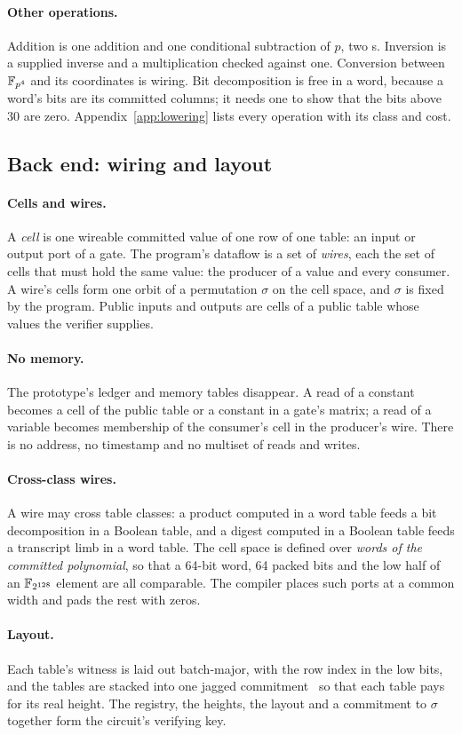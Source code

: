 \paragraph{Other operations.} Addition is one addition and one conditional subtraction of $p$, two \AND{}s. Inversion is a supplied inverse and a multiplication checked against one. Conversion between $\mathbb{F}_{p^4}$ and its coordinates is wiring. Bit decomposition is free in a word, because a word's bits are its committed columns; it needs one \AND{} to show that the bits above $30$ are zero. Appendix~\ref{app:lowering} lists every operation with its class and cost.

\subsection{Back end: wiring and layout}\label{sec:compiler-wiring}

\paragraph{Cells and wires.} A \emph{cell} is one wireable committed value of one row of one table: an input or output port of a gate. The program's dataflow is a set of \emph{wires}, each the set of cells that must hold the same value: the producer of a value and every consumer. A wire's cells form one orbit of a permutation $\sigma$ on the cell space, and $\sigma$ is fixed by the program. Public inputs and outputs are cells of a public table whose values the verifier supplies.

\paragraph{No memory.} The prototype's ledger and memory tables disappear. A read of a constant becomes a cell of the public table or a constant in a gate's matrix; a read of a variable becomes membership of the consumer's cell in the producer's wire. There is no address, no timestamp and no multiset of reads and writes.

\paragraph{Cross-class wires.} A wire may cross table classes: a \KB{} product computed in a word table feeds a bit decomposition in a Boolean table, and a \Blake{} digest computed in a Boolean table feeds a transcript limb in a word table. The cell space is defined over \emph{words of the committed polynomial}, so that a 64-bit word, 64 packed bits and the low half of an $\mathbb{F}_{2^{128}}$ element are all comparable. The compiler places such ports at a common width and pads the rest with zeros.

\paragraph{Layout.} Each table's witness is laid out batch-major, with the row index in the low bits, and the tables are stacked into one jagged commitment~\citep{jagged-pcs} so that each table pays for its real height. The registry, the heights, the layout and a commitment to $\sigma$ together form the circuit's verifying key.
